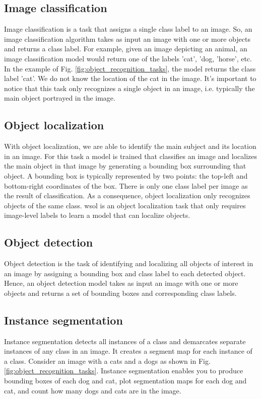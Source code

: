 \subsection{Image classification}
Image classification is a task that assigns a single class label to an image. So, an image classification algorithm takes as input an image with one or more objects and returns a class label. For example, given an image depicting an animal, an image classification model would return one of the labels 'cat', 'dog, 'horse', etc. In the example of Fig. \ref{fig:object_recognition_tasks}, the model returns the class label 'cat'. We do not know the location of the cat in the image. It's important to notice that this task only recognizes a single object in an image, i.e. typically the main object portrayed in the image. 

\subsection{Object localization}
With object localization, we are able to identify the main subject and its location in an image. For this task a model is trained that classifies an image and localizes the main object in that image by generating a bounding box surrounding that object. A bounding box is typically represented by two points: the top-left and bottom-right coordinates of the box. There is only one class label per image as the result of classification. As a consequence, object localization only recognizes objects of the same class. \acrfull{wsol} is an object localization task that only requires image-level labels to learn a model that can localize objects.

\subsection{Object detection}
Object detection is the task of identifying and localizing all objects of interest in an image by assigning a bounding box and class label to each detected object. Hence, an object detection model takes as input an image with one or more objects and returns a set of bounding boxes and corresponding class labels.

\subsection{Instance segmentation}
Instance segmentation detects all instances of a class and demarcates separate instances of any class in an image. It creates a segment map for each instance of a class. Consider an image with a cats and a dogs as shown in Fig. \ref{fig:object_recognition_tasks}. Instance segmentation enables you to produce bounding boxes of each dog and cat, plot segmentation maps for each dog and cat, and count how many dogs and cats are in the image.

